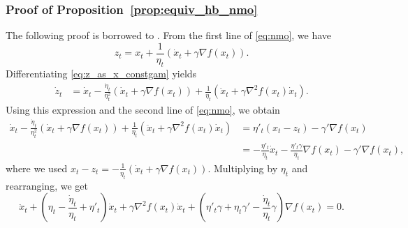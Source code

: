 \documentclass{article}
\newcommand{\bpar}[1]{\left(#1\right)}
\theoremstyle{plain}
\theoremstyle{definition}
\theoremstyle{remark}
\begin{document}
\subsubsection{Proof of Proposition~\ref{prop:equiv_hb_nmo}}
The following proof is borrowed to \cite[Proposition 27]{hermant2025continuized}.
 From the first line of
\eqref{eq:nmo}, we have
\begin{equation}\label{eq:z_as_x_constgam}
    z_t = x_t + \frac{1}{\eta_t}\bpar{\dot{x}_t +  \gamma \nabla f(x_t)}.
\end{equation}
Differentiating \eqref{eq:z_as_x_constgam} yields
\begin{align}
    \dot{z}_t
    &= \dot{x}_t - \frac{\dot{\eta}_t}{\eta_t^2}\bpar{\dot{x}_t +  \gamma \nabla f(x_t)}
    + \frac{1}{\eta_t}\bpar{\ddot{x}_t +  \gamma \nabla^2 f(x_t)\dot{x}_t}.
\end{align}
Using this expression and the second line of \eqref{eq:nmo}, we obtain
\begin{align}
     \dot{x}_t - \frac{\dot{\eta}_t}{\eta_t^2}\bpar{\dot{x}_t +  \gamma \nabla f(x_t)}
     + \frac{1}{\eta_t}\bpar{\ddot{x}_t +  \gamma \nabla^2 f(x_t)\dot{x}_t}
     &=  \eta'_t(x_t-z_t) - \gamma' \nabla f(x_t) \\
     &= -\frac{\eta'_t}{\eta_t}\dot{x}_t -  \frac{\eta'_t \gamma}{\eta_t}\nabla f(x_t) - \gamma' \nabla f(x_t),
\end{align}
where we used $x_t-z_t = -\frac{1}{\eta_t}\bpar{\dot{x}_t +  \gamma \nabla f(x_t)}$.
Multiplying by $\eta_t$ and rearranging, we get
\begin{equation}\label{eq:second_order_x_constgam}
    \ddot{x}_t
    + \bpar{\eta_t - \frac{\dot{\eta}_t}{\eta_t} + \eta'_t }\dot{x}_t
    + \gamma \nabla^2 f(x_t)\dot{x}_t
    + \bpar{ \eta'_t \gamma + \eta_t \gamma' -\frac{\dot{\eta}_t}{\eta_t}\gamma }\nabla f(x_t)
    = 0.
\end{equation}
\end{document}
